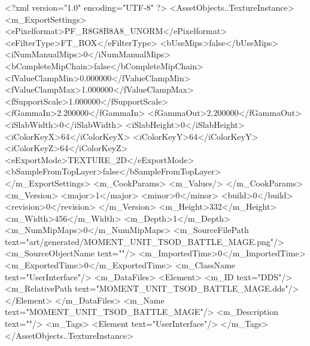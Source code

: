 <?xml version="1.0" encoding="UTF-8" ?>
<AssetObjects..TextureInstance>
	<m_ExportSettings>
		<ePixelformat>PF_R8G8B8A8_UNORM</ePixelformat>
		<eFilterType>FT_BOX</eFilterType>
		<bUseMips>false</bUseMips>
		<iNumManualMips>0</iNumManualMips>
		<bCompleteMipChain>false</bCompleteMipChain>
		<fValueClampMin>0.000000</fValueClampMin>
		<fValueClampMax>1.000000</fValueClampMax>
		<fSupportScale>1.000000</fSupportScale>
		<fGammaIn>2.200000</fGammaIn>
		<fGammaOut>2.200000</fGammaOut>
		<iSlabWidth>0</iSlabWidth>
		<iSlabHeight>0</iSlabHeight>
		<iColorKeyX>64</iColorKeyX>
		<iColorKeyY>64</iColorKeyY>
		<iColorKeyZ>64</iColorKeyZ>
		<eExportMode>TEXTURE_2D</eExportMode>
		<bSampleFromTopLayer>false</bSampleFromTopLayer>
	</m_ExportSettings>
	<m_CookParams>
		<m_Values/>
	</m_CookParams>
	<m_Version>
		<major>1</major>
		<minor>0</minor>
		<build>0</build>
		<revision>0</revision>
	</m_Version>
	<m_Height>332</m_Height>
	<m_Width>456</m_Width>
	<m_Depth>1</m_Depth>
	<m_NumMipMaps>0</m_NumMipMaps>
	<m_SourceFilePath text="art/generated/MOMENT_UNIT_TSOD_BATTLE_MAGE.png"/>
	<m_SourceObjectName text=""/>
	<m_ImportedTime>0</m_ImportedTime>
	<m_ExportedTime>0</m_ExportedTime>
	<m_ClassName text="UserInterface"/>
	<m_DataFiles>
		<Element>
			<m_ID text="DDS"/>
			<m_RelativePath text="MOMENT_UNIT_TSOD_BATTLE_MAGE.dds"/>
		</Element>
	</m_DataFiles>
	<m_Name text="MOMENT_UNIT_TSOD_BATTLE_MAGE"/>
	<m_Description text=""/>
	<m_Tags>
		<Element text="UserInterface"/>
	</m_Tags>
</AssetObjects..TextureInstance>
